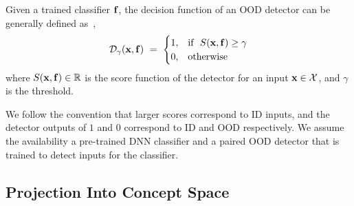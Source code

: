 Given a trained classifier $\mathbf{f}$, the decision function of an OOD detector can be generally defined as~\citep{liu2020energy},
\begin{equation}
\label{eq:ood_detector}
\mathcal{D}_\gamma(\mathbf{x}, \mathbf{f}) ~=~ 
\begin{cases}
1, & \text{if } ~S(\mathbf{x}, \mathbf{f}) \geq \gamma \\
0, & \text{otherwise }
\end{cases}
\end{equation}
where $S(\mathbf{x}, \mathbf{f}) \in \mathbb{R}$ is the score function of the detector for an input $\mathbf{x} \in \mathcal{X}$, and $\gamma$ is the threshold.

\fi
%
We follow the convention that larger scores correspond to ID inputs, and the detector outputs of $1$ and $0$ correspond to ID and OOD respectively.
We assume the availability a pre-trained DNN classifier and a paired OOD detector that is 
trained to detect inputs for the classifier.

\subsection{Projection Into Concept Space}
\label{sec:concept_projection}

